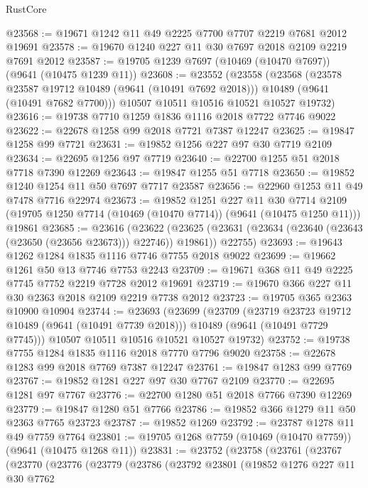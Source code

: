 \begin{lexlean}{RustCore}
\begin{coremodule}
@23568 := @19671 @1242 @11 @49 @2225 @7700 @7707 @2219 @7681 @2012 @19691
@23578 := @19670 @1240 @227 @11 @30 @7697 @2018 @2109 @2219 @7691 @2012
@23587 := @19705 @1239 @7697 (@10469 (@10470 @7697)) (@9641 (@10475 @1239 @11))
@23608 := @23552
    (@23558
      (@23568
        (@23578 @23587 @19712 @10489 (@9641 (@10491 @7692 @2018)))
        @10489
        (@9641 (@10491 @7682 @7700)))
      @10507
      @10511
      @10516
      @10521
      @10527
      @19732)
@23616 := @19738 @7710 @1259 @1836 @1116 @2018 @7722 @7746 @9022
@23622 := @22678 @1258 @99 @2018 @7721 @7387 @12247
@23625 := @19847 @1258 @99 @7721
@23631 := @19852 @1256 @227 @97 @30 @7719 @2109
@23634 := @22695 @1256 @97 @7719
@23640 := @22700 @1255 @51 @2018 @7718 @7390 @12269
@23643 := @19847 @1255 @51 @7718
@23650 := @19852 @1240 @1254 @11 @50 @7697 @7717 @23587
@23656 := @22960 @1253 @11 @49 @7478 @7716 @22974
@23673 := @19852
    @1251
    @227
    @11
    @30
    @7714
    @2109
    (@19705 @1250 @7714 (@10469 (@10470 @7714)) (@9641 (@10475 @1250 @11)))
    @19861
@23685 := @23616
    (@23622
      (@23625 (@23631 (@23634 (@23640 (@23643 (@23650 (@23656 @23673))) @22746)) @19861))
      @22755)
@23693 := @19643 @1262 @1284 @1835 @1116 @7746 @7755 @2018 @9022
@23699 := @19662 @1261 @50 @13 @7746 @7753 @2243
@23709 := @19671 @368 @11 @49 @2225 @7745 @7752 @2219 @7728 @2012 @19691
@23719 := @19670 @366 @227 @11 @30 @2363 @2018 @2109 @2219 @7738 @2012
@23723 := @19705 @365 @2363 @10900 @10904
@23744 := @23693
    (@23699
      (@23709
        (@23719 @23723 @19712 @10489 (@9641 (@10491 @7739 @2018)))
        @10489
        (@9641 (@10491 @7729 @7745)))
      @10507
      @10511
      @10516
      @10521
      @10527
      @19732)
@23752 := @19738 @7755 @1284 @1835 @1116 @2018 @7770 @7796 @9020
@23758 := @22678 @1283 @99 @2018 @7769 @7387 @12247
@23761 := @19847 @1283 @99 @7769
@23767 := @19852 @1281 @227 @97 @30 @7767 @2109
@23770 := @22695 @1281 @97 @7767
@23776 := @22700 @1280 @51 @2018 @7766 @7390 @12269
@23779 := @19847 @1280 @51 @7766
@23786 := @19852 @366 @1279 @11 @50 @2363 @7765 @23723
@23787 := @19852 @1269
@23792 := @23787 @1278 @11 @49 @7759 @7764
@23801 := @19705 @1268 @7759 (@10469 (@10470 @7759)) (@9641 (@10475 @1268 @11))
@23831 := @23752
    (@23758
      (@23761
        (@23767
          (@23770
            (@23776
              (@23779
                (@23786
                  (@23792
                    @23801
                    (@19852
                      @1276
                      @227
                      @11
                      @30
                      @7762

\end{coremodule}
\end{lexlean}
